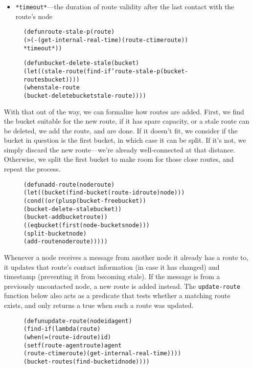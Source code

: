 \documentclass [a4paper,12pt,oneside]{article}\usepackage [paper=a4paper,left=37.5264mm,right=37.5264mm,top=37.5264mm,bottom=37.5264mm]{geometry}\usepackage {graphicx}\usepackage {tabularx}\usepackage {alltt}\usepackage {float}\usepackage [section]{placeins}\usepackage {titling}\setlength {\droptitle }{-4em}\pretitle {\begin {flushright}\bfseries \LARGE }\posttitle {\end {flushright}}\preauthor {\begin {flushright}}\postauthor {\end {flushright}}\predate {\begin {flushright}}\postdate {\end {flushright}}\usepackage [english]{babel}\usepackage [T1]{fontenc}\usepackage [utf8x]{inputenc}\usepackage {stmaryrd}\usepackage {amsfonts}\DeclareUnicodeCharacter {12314}{$\llbracket $}\DeclareUnicodeCharacter {12315}{$\rrbracket $}\DeclareUnicodeCharacter {9655}{$\rhd $}\newcommand \nobreakdash {\mbox {-}}\DeclareUnicodeCharacter {8209}{\nobreakdash }\usepackage [sc]{mathpazo}\linespread {1.05}\usepackage [font={small},labelformat=empty,labelsep=none]{caption}\tolerance=10000 \clubpenalty=10000 \widowpenalty=10000 \frenchspacing
\begin{document}
\begin {itemize}\raggedright \item \texttt {*timeout*}—the duration of route validity after the last contact with the route’s node\end {itemize}

\begin {figure}[H]\centering \begin {alltt}
(defun route-stale-p (route)
  (> (- (get-internal-real-time) (route-ctime route))
     *timeout*))

(defun bucket-delete-stale (bucket)
  (let ((stale-route (find-if 'route-stale-p (bucket-routes bucket))))
    (when stale-route
      (bucket-delete bucket stale-route))))
\end{alltt}\vspace {-1em}\end {figure}

With that out of the way, we can formalize how routes are added. First, we find the bucket suitable for the new route, if it has spare capacity, or a stale route can be deleted, we add the route, and are done. If it doesn’t fit, we consider if the bucket in question is the first bucket, in which case it can be split. If it’s not, we simply discard the new route—we’re already well-connected at that distance. Otherwise, we split the first bucket to make room for those close routes, and repeat the process.

\begin {figure}[H]\centering \begin {alltt}
(defun add-route (node route)
  (let ((bucket (find-bucket (route-id route) node)))
    (cond ((or (plusp (bucket-free bucket))
               (bucket-delete-stale bucket))
           (bucket-add bucket route))
          ((eq bucket (first (node-buckets node)))
           (split-bucket node)
           (add-route node route)))))
\end{alltt}\vspace {-1em}\end {figure}

Whenever a node receives a message from another node it already has a route to, it updates that route’s contact information (in case it has changed) and timestamp (preventing it from becoming stale). If the message is from a previously uncontacted node, a new route is added instead. The \texttt {update-route} function below also acts as a predicate that tests whether a matching route exists, and only returns a true when such a route was updated.

\begin {figure}[H]\centering \begin {alltt}
(defun update-route (node id agent)
  (find-if (lambda (route)
             (when (= (route-id route) id)
               (setf (route-agent route) agent
                     (route-ctime route) (get-internal-real-time))))
           (bucket-routes (find-bucket id node))))
\end{alltt}\vspace {-1em}\end {figure}
\end{document}

